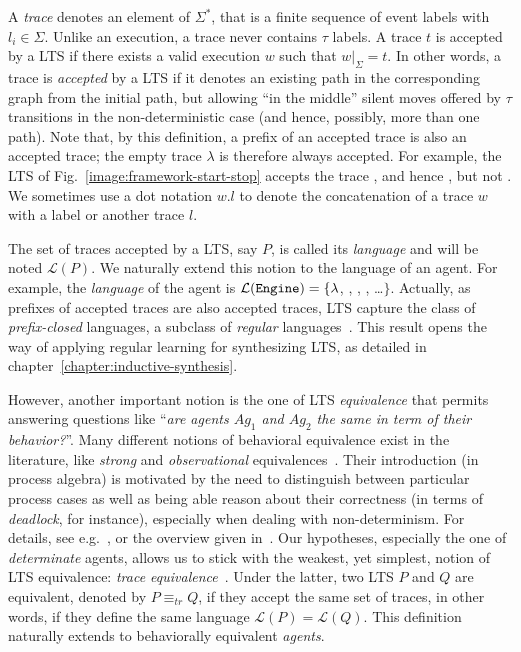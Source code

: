 A \emph{trace} denotes an element of $\Sigma^*$, that is a finite sequence of event labels  with $l_i \in \Sigma$. Unlike an execution, a trace never contains $\tau$ labels. A trace $t$ is accepted by a LTS if there exists a valid execution $w$ such that $w|_{\Sigma} = t$. In other words, a trace is \emph{accepted} by a LTS if it denotes an existing path in the corresponding graph from the initial path, but allowing ``in the middle'' silent moves offered by $\tau$ transitions in the non-deterministic case (and hence, possibly, more than one path). Note that, by this definition, a prefix of an accepted trace is also an accepted trace; the empty trace $\lambda$ is therefore always accepted. For example, the LTS of Fig.~\ref{image:framework-start-stop} accepts the trace , and hence , but not . We sometimes use a dot notation $w.l$ to denote the concatenation of a trace $w$ with a label or another trace $l$.

The set of traces accepted by a LTS, say $P$, is called its \emph{language} and will be noted $\mathcal{L}(P)$. We naturally extend this notion to the language of an agent. For example, the  \emph{language} of the  agent is $\mathcal{L}(\texttt{Engine})=\{\lambda$, , , , \ldots $\}$. Actually, as prefixes of accepted traces are also accepted traces, LTS capture the class of \emph{prefix-closed} languages, a subclass of \emph{regular} languages~\cite{Hopcroft:1979}. This result opens the way of applying regular learning for synthesizing LTS, as detailed in chapter~\ref{chapter:inductive-synthesis}.

However, another important notion is the one of LTS \emph{equivalence} that permits answering questions like ``\emph{are agents $Ag_1$ and $Ag_2$ the same in term of their behavior?}''. Many different notions of behavioral equivalence exist in the literature, like \emph{strong} and \emph{observational}  equivalences~\cite{Milner:1989}. Their introduction (in process algebra) is motivated by the need to distinguish between particular process cases as well as being able reason about their correctness (in terms of \emph{deadlock}, for instance), especially when dealing with non-determinism. For details, see e.g.~\cite[chap. 3]{Hoare:1985}, \cite[chap. 4 \& 5]{Milner:1989} or the overview given in~\cite{Fernandez:1991}. Our hypotheses, especially the one of \emph{determinate} agents, allows us to stick with the weakest, yet simplest, notion of LTS equivalence: \emph{trace equivalence}~\cite{Hoare:1985, Engelfriet:1985}. Under the latter, two LTS $P$ and $Q$ are equivalent, denoted by $P \equiv_{tr} Q$, if they accept the same set of traces, in other words, if they define the same language $\mathcal{L}(P) = \mathcal{L}(Q)$. This definition naturally extends to behaviorally equivalent \emph{agents}.

